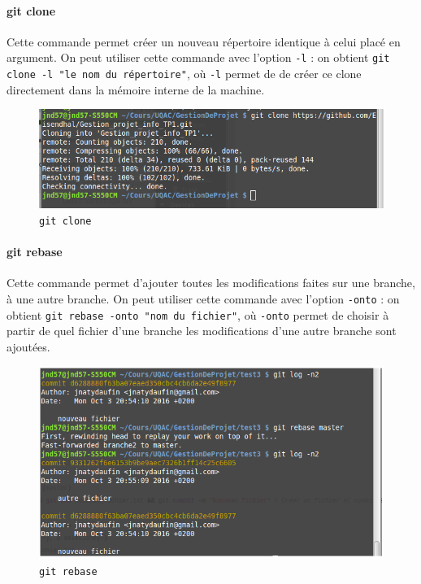 \documentclass[11pt,canadien]{article}
\begin{document}
\paragraph{git clone}Cette commande permet créer un nouveau répertoire identique à celui placé en argument. On peut utiliser cette commande avec l’option \texttt{-l} : on obtient \texttt{git clone -l "le nom du répertoire"}, où \texttt{-l} permet de de créer ce clone directement dans la mémoire interne de la machine.
\begin{figure}[h]
	\centering
	\includegraphics[width=\textwidth]{images/git-clone.png}
	\caption{\texttt{git clone}}
	\label{fig:git_clone}
\end{figure}

\paragraph{git rebase}Cette commande permet d'ajouter toutes les modifications faites sur une branche, à une autre branche. On peut utiliser cette commande avec l'option \texttt{-onto} : on obtient \texttt{git rebase -onto "nom du fichier"}, où \texttt{-onto} permet de choisir à partir de quel fichier d'une branche les modifications d'une autre branche sont ajoutées.
\begin{figure}[h]
	\centering
	\includegraphics[width=\textwidth]{images/git-rebase.png}
	\caption{\texttt{git rebase}}
	\label{fig:git_rebase}
\end{figure}
\end{document}
